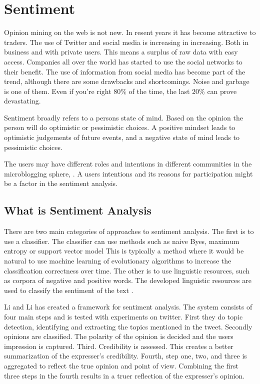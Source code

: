 \section{Sentiment}\label{previous_work:sentiment}

Opinion mining on the web is not new. In resent years it has
become attractive to traders. 
The use of Twitter and social media is increasing in increasing. Both in
business and with private users.
This means a surplus of raw data with
easy access. Companies all over the world has started to use the social
networks to their benefit. The use of information from social media has become
part of the trend, although there are some drawbacks and shortcomings. Noise and
garbage is one of them. Even if you're right 80\% of the time, the last 20\% can
prove devastating. \cite[]{stevenson12:social_media_stock_pickers}

Sentiment broadly refers to a persons state of mind. Based on the opinion the
person will do optimistic or pessimistic choices. A positive mindset leads to
optimistic judgements of future events, and a negative state of mind leads to
pessimistic choices.
\cite[p4]{doukas10:sentiment_and_momentum}

The users may have different roles and intentions in different
communities in the microblogging sphere, \cite[]{java07}. 
A users intentions and its reasons for participation might be a factor in the sentiment analysis.

\subsection{What is Sentiment Analysis}
There are two main categories of approaches to sentiment analysis. 
	The first is to use a classifier. The classifier can use methods such as
naive Byes, maximum entropy or support vector model \cite[]{Li2013206} This is
typically a method where it would be natural to use machine learning of
evolutionary algorithms to increase the classification correctness over time. 
	The other is to use linguistic resources, such as corpora of negative and
positive words. The developed linguistic resources are used to classify the
sentiment of the text \cite[]{Li2013206}.

Li and Li has created a framework for sentiment analysis. The system
consists of four main steps  and is tested with experiments on twitter. 
	First they do topic detection, identifying and extracting the topics
mentioned in the tweet. 
	Secondly opinions are classified. The polarity of the opinion is decided and
the users impression is captured. 	
	Third. Credibility is assessed. This creates a better summarization of the
expresser's credibility. 
	Fourth, step one, two, and three is aggregated to reflect the true opinion
and point of view.
	Combining the first three steps in the fourth results in a truer reflection of
the expresser's opinion. \cite[]{Li2013206} 

